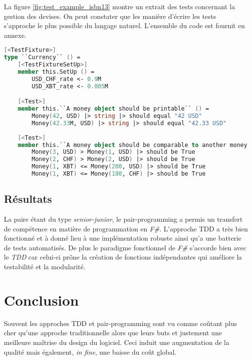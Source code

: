 \documentclass[journal, a4paper, frenchb]{IEEEtran}
\begin{document}
La figure \ref{fig:test_example_isbn13} montre un extrait des tests concernant la gestion des devises. On peut constater que les manière d'écrire les tests s'approche le plus possible du langage naturel. L'ensemble du code est fournit en annexe.

\begin{figure*}[!t]
\caption{Exemple de tests concernant le type \texttt{Money}}
\label{fig:test_example_isbn13}
\begin{lstlisting}[language=FSharp, frame=single, basicstyle=\ttfamily\small]
[<TestFixture>]
type ``Currency`` () =
    [<TestFixtureSetUp>]
    member this.SetUp () =
        USD_CHF_rate <- 0.9M
        USD_XBT_rate <- 0.005M

    [<Test>]
    member this.``A money object should be printable`` () =
        Money(42, USD) |> string |> should equal "42 USD"
        Money(42.33M, USD) |> string |> should equal "42.33 USD"
        
    [<Test>]
    member this.``A money object should be comparable to another money object`` () =
        Money(3, USD) > Money(1, USD) |> should be True
        Money(2, CHF) > Money(2, USD) |> should be True
        Money(1, XBT) <= Money(200, USD) |> should be True
        Money(1, XBT) <= Money(180, CHF) |> should be True
\end{lstlisting}
\end{figure*}


\subsection{Résultats}

La paire étant du type \emph{senior-junior}, le pair-programming a permis un transfert de compétence en matière de programmation en \emph{F\#}. L'approche TDD a très bien fonctionné et à donné lieu à une implémentation robuste ainsi qu'a une batterie de tests automatisés. De plus le paradigme fonctionnel de \emph{F\#} s'accorde bien avec le \emph{TDD} car celui-ci prône la création de fonctions indépendantes qui améliore la testabilité et la modularité.


\section{Conclusion}

Souvent les approches TDD et pair-programming sont vu comme coûtant plus cher qu'une approche traditionnelle alors que leurs buts et justement une meilleure maîtrise du design du logiciel. Ceci induit une augmentation de la qualité mais également, \emph{in fine}, une baisse du coût global.
\end{document}

